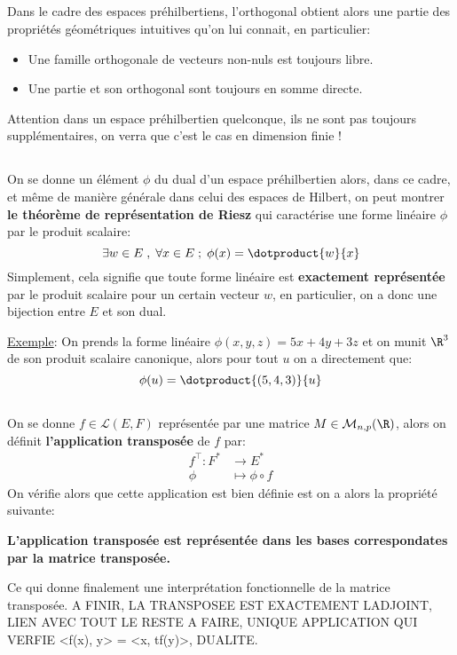\subsection*{}
Dans le cadre des espaces préhilbertiens, l'orthogonal obtient alors une partie des propriétés géométriques intuitives qu'on lui connait, en particulier:
\begin{itemize}
   \item Une famille orthogonale de vecteurs non-nuls est toujours libre.
   \item Une partie et son orthogonal sont toujours en somme directe.
\end{itemize}
Attention dans un espace préhilbertien quelconque, ils ne sont pas toujours supplémentaires, on verra que c'est le cas en dimension finie !
\subsection*{}
On se donne un élément \(\phi\) du dual d'un espace préhilbertien alors, dans ce cadre, et même de manière générale dans celui des espaces de Hilbert, on peut montrer \textbf{le théorème de représentation de Riesz} qui caractérise une forme linéaire \(\phi\) par le produit scalaire:
\[
   \exists w \in E \; , \; \forall x \in E \; ; \; \phi(x) = \dotproduct{w}{x}   
\]
Simplement, cela signifie que toute forme linéaire est \textbf{exactement représentée} par le produit scalaire pour un certain vecteur \(w\), en particulier, on a donc une bijection entre \(E\) et son dual.\<

\uline{Exemple}: On prends la forme linéaire \(\phi(x, y ,z) = 5x+4y+3z\) et on munit \(\R^3\) de son produit scalaire canonique, alors pour tout \(u\) on a directement que:
\[
   \phi(u) = \dotproduct{(5, 4, 3)}{u}
\]
\subsection*{}
On se donne \(f \in \mathcal{L}(E, F)\) représentée par une matrice \(M \in \mathcal{M}_{n, p}(\R)\), alors on définit \textbf{l'application transposée} de \(f\) par:
\[
   \begin{aligned}
      f^\top : F^* &\longrightarrow E^*\\
      \phi &\longmapsto \phi \circ f
   \end{aligned}
\]
On vérifie alors que cette application est bien définie est on a alors la propriété suivante:
\begin{center}
   \textbf{L'application transposée est représentée dans les bases correspondates par la matrice transposée.}
\end{center}
Ce qui donne finalement une interprétation fonctionnelle de la matrice transposée. A FINIR, LA TRANSPOSEE EST EXACTEMENT LADJOINT, LIEN AVEC TOUT LE RESTE A FAIRE, UNIQUE APPLICATION QUI VERFIE <f(x), y> = <x, tf(y)>, DUALITE.
